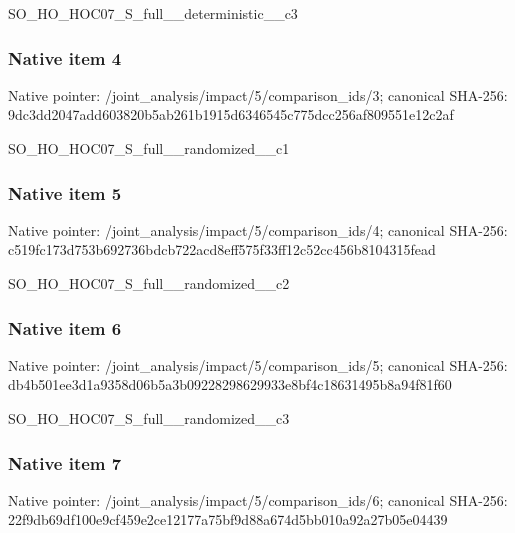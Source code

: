 \documentclass[10pt,a4paper]{article}
\begin{document}
\begingroup\raggedright\sloppy SO\_\allowbreak{}HO\_\allowbreak{}HOC07\_\allowbreak{}S\_\allowbreak{}full\_\allowbreak{}\_\allowbreak{}deterministic\_\allowbreak{}\_\allowbreak{}c3\par\endgroup

\subsubsection{Native item 4}
Native pointer: /joint\_\allowbreak{}analysis/impact/5/comparison\_\allowbreak{}ids/3; canonical SHA-256: 9dc3dd2047add603820b5ab261b1915d6346545c775dcc256af809551e12c2af

\begingroup\raggedright\sloppy SO\_\allowbreak{}HO\_\allowbreak{}HOC07\_\allowbreak{}S\_\allowbreak{}full\_\allowbreak{}\_\allowbreak{}randomized\_\allowbreak{}\_\allowbreak{}c1\par\endgroup

\subsubsection{Native item 5}
Native pointer: /joint\_\allowbreak{}analysis/impact/5/comparison\_\allowbreak{}ids/4; canonical SHA-256: c519fc173d753b692736bdcb722acd8eff575f33ff12c52cc456b8104315fead

\begingroup\raggedright\sloppy SO\_\allowbreak{}HO\_\allowbreak{}HOC07\_\allowbreak{}S\_\allowbreak{}full\_\allowbreak{}\_\allowbreak{}randomized\_\allowbreak{}\_\allowbreak{}c2\par\endgroup

\subsubsection{Native item 6}
Native pointer: /joint\_\allowbreak{}analysis/impact/5/comparison\_\allowbreak{}ids/5; canonical SHA-256: db4b501ee3d1a9358d06b5a3b09228298629933e8bf4c18631495b8a94f81f60

\begingroup\raggedright\sloppy SO\_\allowbreak{}HO\_\allowbreak{}HOC07\_\allowbreak{}S\_\allowbreak{}full\_\allowbreak{}\_\allowbreak{}randomized\_\allowbreak{}\_\allowbreak{}c3\par\endgroup

\subsubsection{Native item 7}
Native pointer: /joint\_\allowbreak{}analysis/impact/5/comparison\_\allowbreak{}ids/6; canonical SHA-256: 22f9db69df100e9cf459e2ce12177a75bf9d88a674d5bb010a92a27b05e04439
\end{document}
